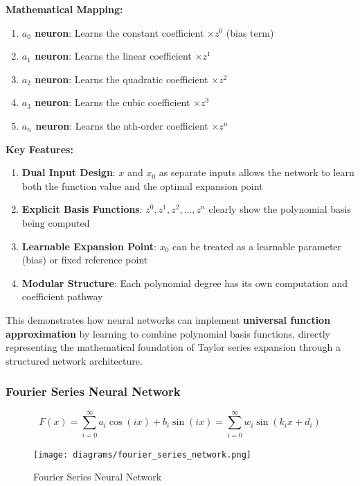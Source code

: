 \textbf{Mathematical Mapping:}

\begin{enumerate}
\item \textbf{$a_0$ neuron}: Learns the constant coefficient $\times z^0$ (bias term)
\item \textbf{$a_1$ neuron}: Learns the linear coefficient $\times z^1$
\item \textbf{$a_2$ neuron}: Learns the quadratic coefficient $\times z^2$
\item \textbf{$a_3$ neuron}: Learns the cubic coefficient $\times z^3$
\item \textbf{$a_n$ neuron}: Learns the nth-order coefficient $\times z^n$
\end{enumerate}

\textbf{Key Features:}

\begin{enumerate}
\item \textbf{Dual Input Design}: $x$ and $x_0$ as separate inputs allows the network to learn both the function value and the optimal expansion point
\item \textbf{Explicit Basis Functions}: $z^0, z^1, z^2, \ldots, z^n$ clearly show the polynomial basis being computed
\item \textbf{Learnable Expansion Point}: $x_0$ can be treated as a learnable parameter (bias) or fixed reference point
\item \textbf{Modular Structure}: Each polynomial degree has its own computation and coefficient pathway
\end{enumerate}

This demonstrates how neural networks can implement \textbf{universal function approximation} by learning to combine polynomial basis functions, directly representing the mathematical foundation of Taylor series expansion through a structured network architecture.

\subsubsection{Fourier Series Neural Network}
\label{subsubsec:fourier-series-nn}

\begin{equation}
\label{eq:fourier-series}
F(x) = \sum_{i=0}^{\infty} a_i \cos(ix) + b_i \sin(ix) = \sum_{i=0}^{\infty} w_i \sin(k_i x + d_i)
\end{equation}

\begin{figure}[h!]
\centering
\texttt{[image: diagrams/fourier\_series\_network.png]}
\caption{Fourier Series Neural Network}
\label{fig:fourier-series-network}
\end{figure}

